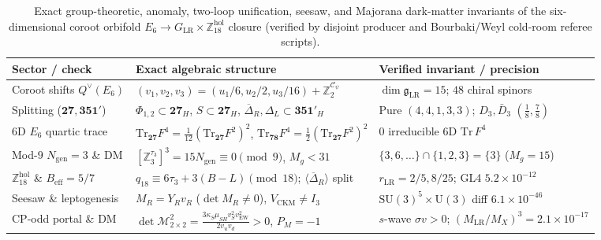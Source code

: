 \documentclass[aps,prd,twocolumn,nofootinbib,floatfix]{revtex4-2}
\begin{document}
\begin{table}[t]
\caption{Exact group-theoretic, anomaly, two-loop unification, seesaw, and Majorana dark-matter invariants of the six-dimensional coroot orbifold $E_6 \to G_{\mathrm{LR}} \times \mathbb{Z}_{18}^{\mathrm{hol}}$ closure (verified by disjoint producer and Bourbaki/Weyl cold-room referee scripts).}
\label{tab:e6lr}
\begin{ruledtabular}
\begin{tabular}{lll}
Sector / check & Exact algebraic structure & Verified invariant / precision \\
\hline
Coroot shifts $Q^\vee(E_6)$ & $(v_1, v_2, v_3) = (u_1/6, u_2/2, u_3/16) + \mathbb{Z}_2^{\mathcal{C}_\psi}$ & $\dim\mathfrak{g}_{\mathrm{LR}} = 15$; $48$ chiral spinors \\
Splitting ($\mathbf{27}, \mathbf{351}'$) & $\Phi_{1,2} \subset \mathbf{27}_{H}$, $S \subset \mathbf{27}_{H}$, $\overline{\Delta}_R, \Delta_L \subset \mathbf{351}'_H$ & Pure $(4, 4, 1, 3, 3)$; $D_3,\bar{D}_3$ $(\frac{1}{8},\frac{7}{8})$ \\
$6\mathrm{D}$ $E_6$ quartic trace & $\mathrm{Tr}_{\mathbf{27}} F^4 = \frac{1}{12}(\mathrm{Tr}_{\mathbf{27}} F^2)^2$, $\mathrm{Tr}_{\mathbf{78}} F^4 = \frac{1}{2}(\mathrm{Tr}_{\mathbf{27}} F^2)^2$ & $0$ irreducible $6\mathrm{D}$ $\mathrm{Tr}\,F^4$ \\
Mod-$9$ $N_{\mathrm{gen}}=3$ \& DM & $[\mathbb{Z}_3^{\tau_3}]^3 = 15 N_{\mathrm{gen}} \equiv 0 \pmod 9$, $M_g < 31$ & $\{3,6,\dots\}\cap\{1,2,3\} = \{3\}$ ($M_g=15$) \\
$\mathbb{Z}_{18}^{\mathrm{hol}}$ \& $B_{\mathrm{eff}} = 5/7$ & $q_{18} \equiv 6\tau_3 + 3(B-L) \pmod{18}$; $\langle\overline{\Delta}_R\rangle$ split & $r_{\mathrm{LR}} = 2/5, 8/25$; GL4 $5.2\times 10^{-12}$ \\
Seesaw \& leptogenesis & $M_R = Y_R v_R$ ($\det M_R \ne 0$), $V_{\mathrm{CKM}} \ne I_3$ & $\mathrm{SU}(3)^5\times\mathrm{U}(3)$ diff $6.1\times 10^{-46}$ \\
CP-odd portal \& DM & $\det\mathcal{M}_{2\times 2}^2 = \frac{3\kappa_S\mu_{SH}v_S^2 v_{\mathrm{EW}}^2}{2v_u v_d} > 0$, $P_M = -1$ & $s$-wave $\sigma v > 0$; $(M_{\mathrm{LR}}/M_X)^3 = 2.1\times 10^{-17}$ \\
\end{tabular}
\end{ruledtabular}
\end{table}
\end{document}
